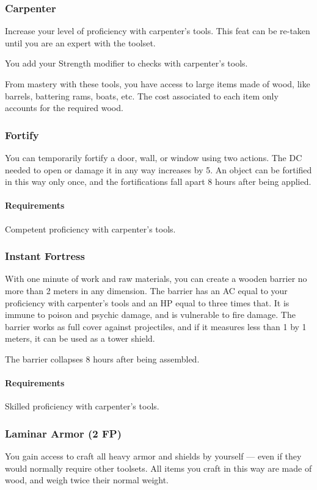 \subsubsection{Carpenter} \label{feat::carpenter}
    Increase your level of proficiency with carpenter's tools.
    This feat can be re-taken until you are an expert with the toolset.

    You add your Strength modifier to checks with carpenter's tools.

    From mastery with these tools, you have access to large items made of wood, like barrels, battering rams, boats, etc.
    The cost associated to each item only accounts for the required wood.
\subsubsection{Fortify} \label{feat::fortify}
    You can temporarily fortify a door, wall, or window using two actions.
    The DC needed to open or damage it in any way increases by 5.
    An object can be fortified in this way only once, and the fortifications fall apart 8 hours after being applied.
    \paragraph{Requirements} Competent proficiency with carpenter's tools.
\subsubsection{Instant Fortress} \label{feat::instantfortress}
    With one minute of work and raw materials, you can create a wooden barrier no more than 2 meters in any dimension.
    The barrier has an AC equal to your proficiency with carpenter's tools and an HP equal to three times that.
    It is immune to poison and psychic damage, and is vulnerable to fire damage.
    The barrier works as full cover against projectiles, and if it measures less than 1 by 1 meters, it can be used as a tower shield.

    The barrier collapses 8 hours after being assembled.
    \paragraph{Requirements} Skilled proficiency with carpenter's tools.
\subsubsection{Laminar Armor (2 FP)} \label{feat::laminararmor}
    You gain access to craft all heavy armor and shields by yourself --- even if they would normally require other toolsets.
    All items you craft in this way are made of wood, and weigh twice their normal weight.

